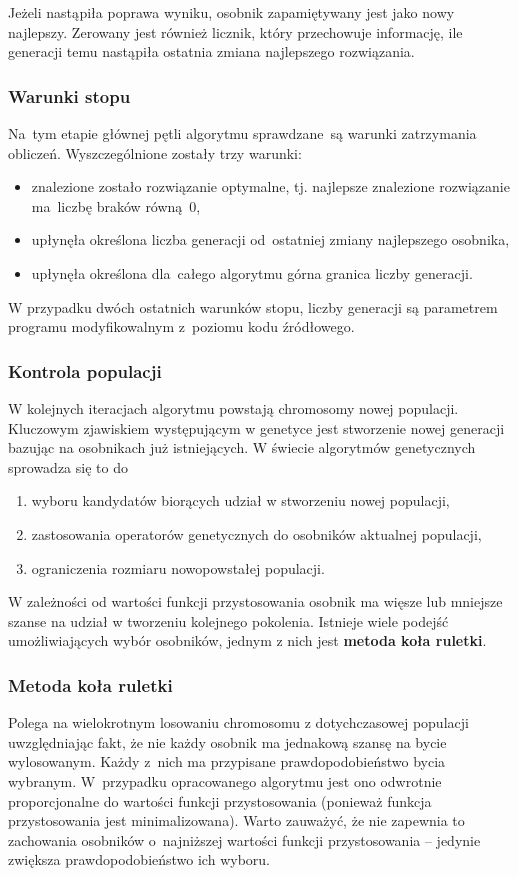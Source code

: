 \documentclass[12pt,a4paper]{article}
\theoremstyle{definition}
\begin{document}
\noindent
Jeżeli nastąpiła poprawa wyniku, osobnik zapamiętywany jest jako nowy najlepszy.
Zerowany jest również licznik, który przechowuje informację, ile generacji temu nastąpiła ostatnia zmiana najlepszego rozwiązania. 

\subsubsection{Warunki stopu}
Na~tym etapie głównej pętli algorytmu sprawdzane~są warunki zatrzymania obliczeń.
Wyszczególnione zostały trzy warunki:
\begin{itemize}
	\item znalezione zostało rozwiązanie optymalne, tj. najlepsze znalezione rozwiązanie ma~liczbę braków równą~0,
	\item upłynęła określona liczba generacji od~ostatniej zmiany najlepszego osobnika,
	\item upłynęła określona dla~całego algorytmu górna granica liczby generacji.
\end{itemize}
W przypadku dwóch ostatnich warunków stopu, liczby generacji są parametrem programu modyfikowalnym z~poziomu kodu źródłowego.

\subsubsection{Kontrola populacji}
W kolejnych iteracjach algorytmu powstają chromosomy nowej populacji. Kluczowym zjawiskiem występującym w genetyce jest stworzenie nowej generacji bazując na osobnikach już istniejących. W świecie algorytmów genetycznych sprowadza się to do
\begin{enumerate}
	\item wyboru kandydatów biorących udział w stworzeniu nowej populacji,
	\item zastosowania operatorów genetycznych do osobników aktualnej populacji,
	\item ograniczenia rozmiaru nowopowstałej populacji.
\end{enumerate}
W zależności od wartości funkcji przystosowania osobnik ma więsze lub mniejsze szanse na udział w tworzeniu kolejnego pokolenia. Istnieje wiele podejść umożliwiających wybór osobników, jednym z nich jest \textbf{metoda koła ruletki}.

\subsubsection*{Metoda koła ruletki}
Polega na wielokrotnym losowaniu chromosomu z dotychczasowej populacji uwzględniając fakt, że nie każdy osobnik ma jednakową szansę na bycie wylosowanym. Każdy z~nich ma przypisane prawdopodobieństwo bycia wybranym.
W~przypadku opracowanego algorytmu jest ono odwrotnie proporcjonalne do wartości funkcji przystosowania (ponieważ funkcja przystosowania jest minimalizowana). Warto zauważyć, że nie zapewnia to zachowania osobników o~najniższej wartości funkcji przystosowania -- jedynie zwiększa prawdopodobieństwo ich wyboru.\\
\end{document}
